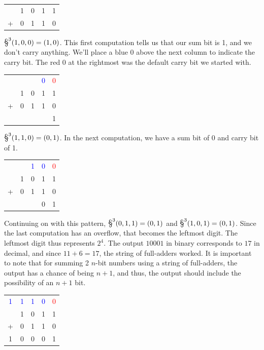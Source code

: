 \documentclass[oneside]{book}
\begin{document}
\begin{center}
\begin{tabular}{c c c c c}
& 1 & 0 & 1 & 1 \\
+ & 0 & 1 & 1 & 0
\end{tabular}
\end{center}
\tab
$\hadd^3(1,0,0) = (1,0)$. This first computation tells us that our sum bit is 1, and we don't carry anything. We'll place a blue 0 above the next column to indicate the carry bit. The red 0 at the rightmost was the default carry bit we started with. 
\begin{center}
\begin{tabular}{c c c c c}
&  &  & \textcolor{blue}{0} &  \textcolor{red}{0} \\
& 1 & 0 & 1 & 1 \\
+ & 0 & 1 & 1 & 0\\
\hline
& & & & 1
\end{tabular}
\end{center}
\tab
$\hadd^3(1,1,0)=(0,1)$. In the next computation, we have a sum bit of 0 and carry bit of 1.
\begin{center}
\begin{tabular}{c c c c c}
&  &  \textcolor{blue}{1} & \textcolor{blue}{0} & \textcolor{red}{0} \\
& 1 & 0 & 1 & 1 \\
+ & 0 & 1 & 1 & 0\\
\hline
& & & 0 & 1
\end{tabular}
\end{center}
\tab
Continuing on with this pattern, $\hadd^3(0,1,1)=(0,1)$ and $\hadd^3(1,0,1)=(0,1)$. Since the last computation has an overflow, that becomes the leftmost digit. The leftmost digit thus represents $2^4$. The output $10001$ in binary corresponds to $17$ in decimal, and since $11+6=17$, the string of full-adders worked. It is important to note that for summing 2 $n$-bit numbers using a string of full-adders, the output has a chance of being $n+1$, and thus, the output should include the possibility of an $n+1$ bit.
\begin{center}
\begin{tabular}{c c c c c}
\textcolor{blue}{1} &  \textcolor{blue}{1}&  \textcolor{blue}{1} & \textcolor{blue}{0} & \textcolor{red}{0} \\
& 1 & 0 & 1 & 1 \\
+ & 0 & 1 & 1 & 0\\
\hline
1& 0 & 0 & 0 & 1
\end{tabular}
\end{center}
\end{document}
